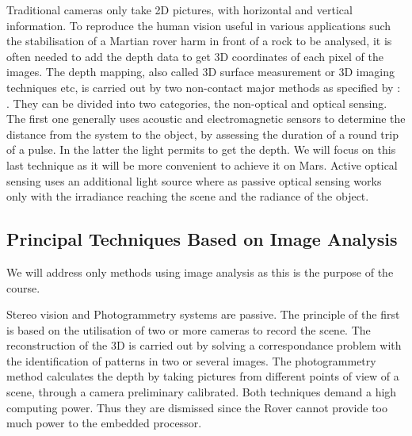 Traditional cameras only take 2D pictures, with horizontal and vertical information. To reproduce the human vision useful in various applications such the stabilisation of a Martian rover harm in front of a rock to be analysed, it is often needed to add the depth data to get 3D coordinates of each pixel of the images. The depth mapping, also called 3D surface measurement or 3D imaging techniques etc, is carried out by two non-contact major methods as specified by \cite{sansoni2009state}: . They can be divided into two categories, the non-optical and optical sensing. The first one generally uses acoustic and electromagnetic sensors to determine the distance from the system to the object, by assessing the duration of a round trip of a pulse. In the latter the light permits to get the depth. We will focus on this last technique as it will be more convenient to achieve it on Mars. Active optical sensing uses an additional light source where as passive optical sensing works only with the irradiance reaching the scene and the radiance of the object. 

\subsection{Principal Techniques Based on Image Analysis}
We will address only methods using image analysis as this is the purpose of the course.

Stereo vision and Photogrammetry systems are passive. The principle of the first is based on the utilisation of two or more cameras to record the scene.  The reconstruction of the 3D is carried out by solving a correspondance problem with the identification of patterns in two or several images. The photogrammetry method calculates the depth by taking pictures from different points of view of a scene, through a camera preliminary calibrated. Both techniques demand a high computing power. Thus they are dismissed since the Rover cannot provide too much power to the embedded processor. 

